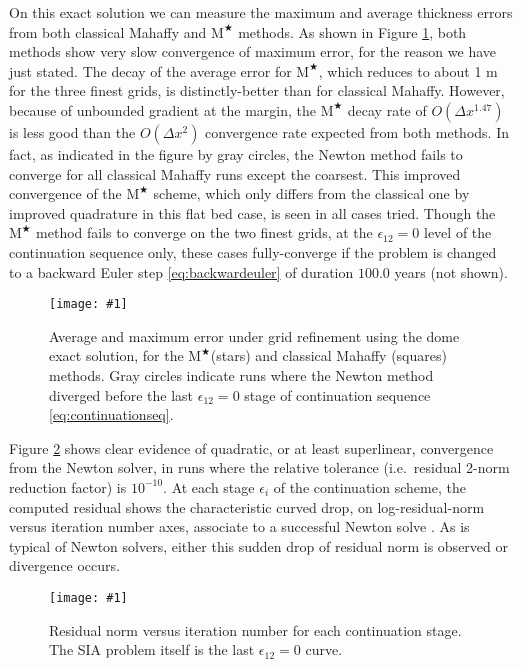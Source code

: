 \documentclass[twocolumn,letterpaper]{igs}
\newcommand{\onecol}[1]{\texttt{[image: \#1]}}
\newcommand\eps{\epsilon}
\newcommand{\Mstar}{$\text{M}^{\bigstar}$\xspace}
\begin{document}
On this exact solution we can measure the maximum and average thickness errors from both classical Mahaffy and \Mstar methods.  As shown in Figure \ref{fig:domeverif}, both methods show very slow convergence of maximum error, for the reason we have just stated.  The decay of the average error for \Mstar, which reduces to about 1 m for the three finest grids, is distinctly-better than for classical Mahaffy.  However, because of unbounded gradient at the margin, the \Mstar decay rate of $O(\Delta x^{1.47})$ is less good than the $O(\Delta x^2)$ convergence rate expected from both methods.  In fact, as indicated in the figure by gray circles, the Newton method fails to converge for all classical Mahaffy runs except the coarsest.  This improved convergence of the \Mstar scheme, which only differs from the classical one by improved quadrature in this flat bed case, is seen in all cases tried.  Though the \Mstar method fails to converge on the two finest grids, at the $\eps_{12}=0$ level of the continuation sequence only, these cases fully-converge if the problem is changed to a backward Euler step \eqref{eq:backwardeuler} of duration $100.0$ years (not shown).

\begin{figure}[ht]
\onecol{domeverif.pdf}
\caption{Average and maximum error under grid refinement using the dome exact solution, for the \Mstar (stars) and classical Mahaffy (squares) methods.  Gray circles indicate runs where the Newton method diverged before the last $\eps_{12}=0$ stage of continuation sequence \eqref{eq:continuationseq}.}
\label{fig:domeverif}
\end{figure}

Figure \ref{fig:newtonconv} shows clear evidence of quadratic, or at least superlinear, convergence from the Newton solver, in runs where the relative tolerance (i.e.~residual 2-norm reduction factor) is $10^{-10}$.  At each stage $\eps_i$ of the continuation scheme, the computed residual shows the characteristic curved drop, on log-residual-norm versus iteration number axes, associate to a successful Newton solve \citep{Kelley2003}.  As is typical of Newton solvers, either this sudden drop of residual norm is observed or divergence occurs.

\begin{figure}[ht]
\onecol{newtonconv.pdf}
\caption{Residual norm versus iteration number for each continuation stage.  The SIA problem itself is the last $\eps_{12}=0$ curve.}
\label{fig:newtonconv}
\end{figure}
\end{document}
